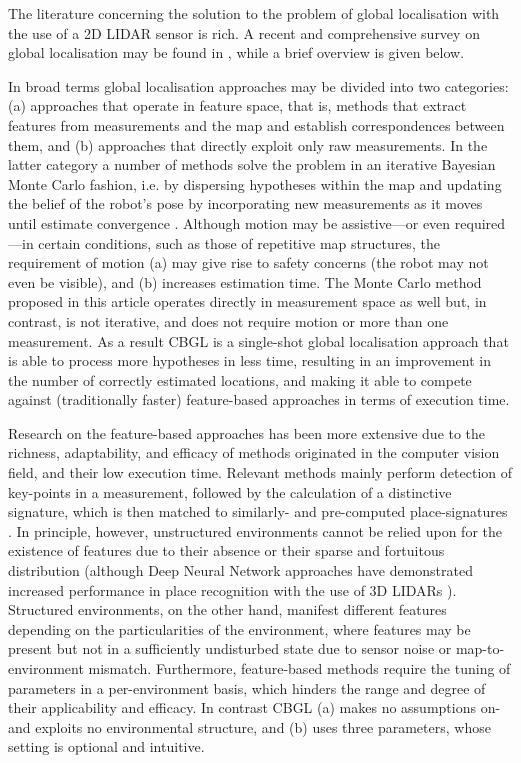 The literature concerning the solution to the problem of global localisation
with the use of a 2D LIDAR sensor is rich. A recent and comprehensive survey on
global localisation may be found in \cite{gl_survey_cn}, while a brief overview
is given below.

In broad terms global localisation approaches may be divided into two
categories: (a) approaches that operate in feature space, that is, methods that
extract features from measurements and the map and establish correspondences
between them, and (b) approaches that directly exploit only raw measurements.
In the latter category a number of methods solve the problem in an iterative
Bayesian Monte Carlo fashion, i.e. by dispersing hypotheses within the map and
updating the belief of the robot's pose by incorporating new measurements as it
moves until estimate convergence
\cite{mcl,Wang2018d,Yilmaz2019a,gmcl,Chen2021a}.
Although motion may be assistive---or even required---in certain conditions,
such as those of repetitive map structures, the requirement of motion (a) may
give rise to safety concerns (the robot may not even be visible), and (b)
increases estimation time. The Monte Carlo method proposed in this article
operates directly in measurement space as well but, in contrast, is not
iterative, and does not require motion or more than one measurement. As a
result CBGL is a single-shot global localisation approach that is able to
process more hypotheses in less time, resulting in an improvement in the number
of correctly estimated locations, and making it able to compete against
(traditionally faster) feature-based approaches in terms of execution time.

Research on the feature-based approaches has been more extensive due to the
richness, adaptability, and efficacy of methods originated in the computer
vision field, and their low execution time. Relevant methods mainly perform
detection of key-points in a measurement, followed by the calculation of a
distinctive signature, which is then matched to similarly- and pre-computed
place-signatures
\cite{Kallasi2016a,als_eth,Usman2019,Wang2021b,Meng2021,Hendrikx2021,An2022,Nielsen2023}.
In principle, however, unstructured environments cannot be relied upon for the
existence of features due to their absence or their sparse and fortuitous
distribution (although Deep Neural Network approaches have demonstrated
increased performance in place recognition with the use of 3D LIDARs
\cite{Xu2021,Yin2022,Komorowski2022}). Structured environments, on the other
hand, manifest different features depending on the particularities of the
environment, where features may be present but not in a sufficiently
undisturbed state due to sensor noise or map-to-environment mismatch.
Furthermore, feature-based methods require the tuning of parameters in a
per-environment basis, which hinders the range and degree of their
applicability and efficacy.  In contrast CBGL (a) makes no assumptions on- and
exploits no environmental structure, and (b) uses three parameters, whose
setting is optional and intuitive.

